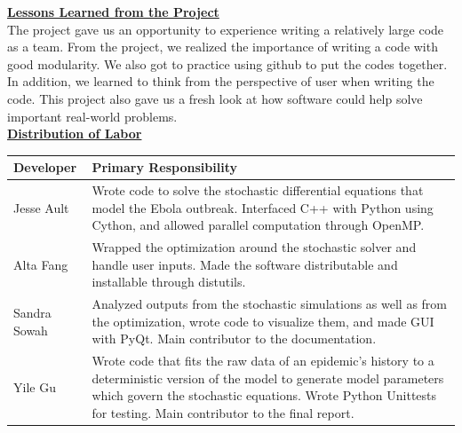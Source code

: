 \documentclass[11pt,letter]{article}
\begin{document}



\underline{\textbf{Lessons Learned from the Project}}\vspace{0.5mm}\\

The project gave us an opportunity to experience writing a relatively large code as a team. From the project, we realized the importance of writing a code with good modularity. We also got to practice using github to put the codes together. In addition, we learned to think from the perspective of user when writing the code. This project also gave us a fresh look at how software could help solve important real-world problems. \\


\underline{\textbf{Distribution of Labor}}\vspace{0.5mm}\\
\begin{center}
	\begin{tabular}{ l | p{13cm}}
           Developer & Primary Responsibility \\ \hline
	Jesse Ault & Wrote code to solve the stochastic differential equations that model the Ebola outbreak. Interfaced C++ with Python using Cython, and allowed parallel computation through OpenMP. \\
	Alta Fang & Wrapped the optimization around the stochastic solver and handle user inputs. Made the software distributable and installable through distutils. \\
	Sandra Sowah & Analyzed outputs from the stochastic simulations as well as from the optimization, wrote code to visualize them, and made GUI with PyQt. Main contributor to the documentation.\\
	Yile Gu & Wrote code that fits the raw data of an epidemic's history to a deterministic version of the model to generate model parameters which govern the stochastic equations. Wrote Python Unittests for testing.  Main contributor to the final report.
	\end{tabular}
\end{center}
\end{document}
